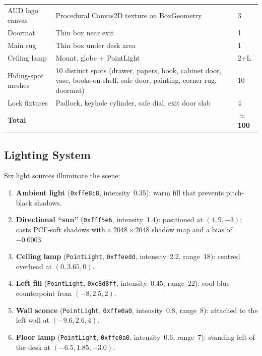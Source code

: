 \documentclass[12pt, a4paper]{report}
\begin{document}
\begin{longtable}{L{3.5cm}L{5cm}C{2cm}}
AUD logo canvas   & Procedural Canvas2D texture on BoxGeometry & 3  \\
Doormat           & Thin box near exit                       & 1   \\
Main rug          & Thin box under desk area                 & 1   \\
Ceiling lamp      & Mount, globe + PointLight                & 2+L \\
Hiding-spot meshes & 10 distinct spots (drawer, papers, book, cabinet door, vase, books-on-shelf, safe door, painting, corner rug, doormat) & 10 \\
Lock fixtures     & Padlock, keyhole cylinder, safe dial, exit door slab & 4 \\
\midrule
\textbf{Total}    &                                          & $\approx$\textbf{100} \\
\end{longtable}

\subsection{Lighting System}

Six light sources illuminate the scene:

\begin{enumerate}[leftmargin=1.5em]
  \item \textbf{Ambient light} (\texttt{0xffe8c8}, intensity~0.35): warm fill
        that prevents pitch-black shadows.
  \item \textbf{Directional ``sun''} (\texttt{0xfff5e6}, intensity~1.4):
        positioned at $(4, 9, -3)$; casts PCF-soft shadows with a
        $2048 \times 2048$ shadow map and a bias of $-0.0003$.
  \item \textbf{Ceiling lamp} (\texttt{PointLight}, \texttt{0xffeedd},
        intensity~2.2, range~18): centred overhead at $(0, 3.65, 0)$.
  \item \textbf{Left fill} (\texttt{PointLight}, \texttt{0xc8d8ff},
        intensity~0.45, range~22): cool blue counterpoint from $(-8, 2.5, 2)$.
  \item \textbf{Wall sconce} (\texttt{PointLight}, \texttt{0xffe0a0},
        intensity~0.8, range~8): attached to the left wall at $(-9.6, 2.6, 4)$.
  \item \textbf{Floor lamp} (\texttt{PointLight}, \texttt{0xffe0a0},
        intensity~0.6, range~7): standing left of the desk at
        $(-6.5, 1.85, -3.0)$.
\end{enumerate}
\end{document}
